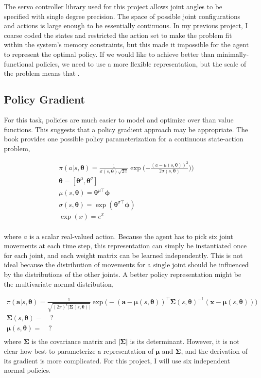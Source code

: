 \documentclass{article}
\newcommand{\thetab}{\bm{\theta}}
\newcommand{\phib}{\bm{\phi}}
\begin{document}
The servo controller library used for this project allows joint angles to be specified with single degree precision. The space of possible joint configurations and actions is large enough to be essentially continuous. In my previous project, I coarse coded the states and restricted the action set to make the problem fit within the system's memory constraints, but this made it impossible for the agent to represent the optimal policy. If we would like to achieve better than minimally-functional policies, we need to use a more flexible representation, but the scale of the problem means that .

\subsection{Policy Gradient}

For this task, policies are much easier to model and optimize over than value functions. This suggests that a policy gradient approach may be appropriate. The book provides one possible policy parameterization for a continuous state-action problem,

\begin{gather*}
	\pi (a | s, \thetab) =  \frac{1}{\sigma(s, \thetab)\sqrt{2\pi}}\exp\bigg({-\frac{(a - \mu(s, {\thetab}))^2}{2\sigma(s, \thetab)})}\bigg)\\
	\thetab = [\thetab^\mu, \thetab^\sigma] \\
	\mu(s, \thetab) = \thetab^{\mu\top}\phib\\
	\sigma(s, \thetab) = \exp(\thetab^{\sigma\top}\phib)\\
	\exp(x) = e^x\\
\end{gather*}

where $a$ is a scalar real-valued action. Because the agent has to pick six joint movements at each time step, this representation can simply be instantiated once for each joint, and each weight matrix can be learned independently. This is not ideal because the distribution of movements for a single joint should be influenced by the distributions of the other joints. A better policy representation might be the multivariate normal distribution,

\begin{gather*}
	\pi (\bm{a} | s, \thetab) =  \frac{1}{\sqrt{(2\pi)^k|\bm{\Sigma}(s, \thetab)|}} \exp\bigg(-(\bm{a} - \bm{\mu}(s, {\thetab}))^\top \bm{\Sigma}(s, \thetab)^{-1}{(\bm{x} - \bm{\mu}(s, \thetab))}\bigg)\\
		\bm{\Sigma}(s, \thetab) =\quad?\\
		\bm{\mu}(s, {\thetab}) =\quad?\\
\end{gather*}
where $\bm{\Sigma}$ is the covariance matrix and $|\bm{\Sigma}|$ is its determinant. However, it is not clear how best to parameterize a representation of $\bm{\mu}$ and $\bm{\Sigma}$, and the derivation of its gradient is more complicated. For this project, I will use six independent normal policies.
\end{document}
